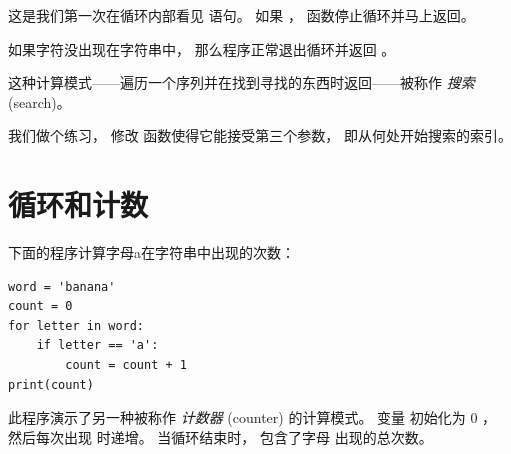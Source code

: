 这是我们第一次在循环内部看见  语句。  如果 ，
函数停止循环并马上返回。


如果字符没出现在字符串中， 那么程序正常退出循环并返回 。

    

这种计算模式——遍历一个序列并在找到寻找的东西时返回——被称作 {\em 搜索} (search)。


我们做个练习， 修改  函数使得它能接受第三个参数， 即从何处开始搜索的索引。

\section{循环和计数}
\label{counter}
  
  


下面的程序计算字母a在字符串中出现的次数：

\begin{lstlisting}
word = 'banana'
count = 0
for letter in word:
    if letter == 'a':
        count = count + 1
print(count)
\end{lstlisting}

%

此程序演示了另一种被称作 {\em 计数器} (counter) 的计算模式。  变量  初始化为 0 ， 然后每次出现  时递增。  当循环结束时，  包含了字母  出现的总次数。

